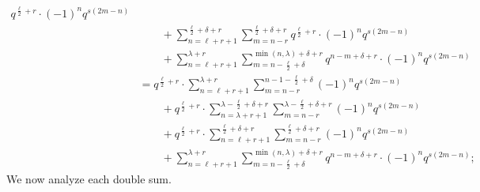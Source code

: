 \begin{align*}
    q^{\frac{\ell}{2}+r} \cdot (-1)^n q^{s(2m-n)} \\
  &\qquad+ \sum_{n=\ell+r+1}^{\frac{\ell}{2}+\delta+r}
    \sum_{m=n-r}^{\frac{\ell}{2}+\delta+r}
    q^{\frac{\ell}{2}+r} \cdot (-1)^n q^{s(2m-n)} \\
  &\qquad+ \sum_{n=\ell+r+1}^{\lambda+r}
    \sum_{m=n-\frac{\ell}{2}+\delta}^{\min(n,\lambda)+\delta+r}
    q^{n-m+\delta+r} \cdot (-1)^n q^{s(2m-n)} \\
  &= q^{\frac{\ell}{2}+r} \cdot \sum_{n=\ell+r+1}^{\lambda+r}
    \sum_{m=n-r}^{n-1-\frac{\ell}{2}+\delta}
    (-1)^n q^{s(2m-n)} \\
  &\qquad+ q^{\frac{\ell}{2}+r} \cdot \sum_{n=\lambda+r+1}^{\lambda-\frac{\ell}{2}+\delta+r}
    \sum_{m=n-r}^{\lambda-\frac{\ell}{2}+\delta+r}
    (-1)^n q^{s(2m-n)} \\
  &\qquad+ q^{\frac{\ell}{2}+r} \cdot \sum_{n=\ell+r+1}^{\frac{\ell}{2}+\delta+r}
    \sum_{m=n-r}^{\frac{\ell}{2}+\delta+r}
    (-1)^n q^{s(2m-n)} \\
  &\qquad+ \sum_{n=\ell+r+1}^{\lambda+r}
    \sum_{m=n-\frac{\ell}{2}+\delta}^{\min(n,\lambda)+\delta+r}
    q^{n-m+\delta+r} \cdot (-1)^n q^{s(2m-n)};
\end{align*}
We now analyze each double sum.

